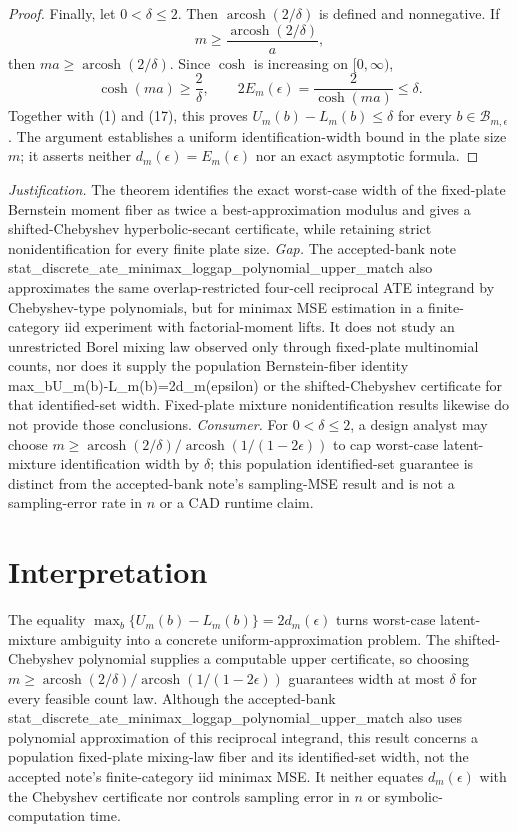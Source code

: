 \documentclass{article}
\begin{document}
\begin{proof}
Finally, let \(0<\delta\leq2\).  Then \(\operatorname{arcosh}(2/\delta)\) is defined and nonnegative.  If
\[
 m\geq\frac{\operatorname{arcosh}(2/\delta)}{a},
\]
then \(ma\geq\operatorname{arcosh}(2/\delta)\).  Since \(\cosh\) is increasing on \([0,\infty)\),
\[
 \cosh(ma)\geq\frac{2}{\delta},
 \qquad
 2E_m(\epsilon)=\frac{2}{\cosh(ma)}\leq\delta.
\]
Together with (1) and (17), this proves \(U_m(b)-L_m(b)\leq\delta\) for every \(b\in\mathcal B_{m,\epsilon}\).  The argument establishes a uniform identification-width bound in the plate size \(m\); it asserts neither \(d_m(\epsilon)=E_m(\epsilon)\) nor an exact asymptotic formula.
\end{proof}
\par\smallskip\noindent \textit{Justification.} The theorem identifies the exact worst-case width of the fixed-plate Bernstein moment fiber as twice a best-approximation modulus and gives a shifted-Chebyshev hyperbolic-secant certificate, while retaining strict nonidentification for every finite plate size. \textit{Gap.} The accepted-bank note stat\_discrete\_ate\_minimax\_loggap\_polynomial\_upper\_match also approximates the same overlap-restricted four-cell reciprocal ATE integrand by Chebyshev-type polynomials, but for minimax MSE estimation in a finite-category iid experiment with factorial-moment lifts. It does not study an unrestricted Borel mixing law observed only through fixed-plate multinomial counts, nor does it supply the population Bernstein-fiber identity max\_b{U\_m(b)-L\_m(b)}=2d\_m(epsilon) or the shifted-Chebyshev certificate for that identified-set width. Fixed-plate mixture nonidentification results likewise do not provide those conclusions. \textit{Consumer.} For \(0<\delta\leq2\), a design analyst may choose \(m\geq\operatorname{arcosh}(2/\delta)/\operatorname{arcosh}(1/(1-2\epsilon))\) to cap worst-case latent-mixture identification width by \(\delta\); this population identified-set guarantee is distinct from the accepted-bank note's sampling-MSE result and is not a sampling-error rate in \(n\) or a CAD runtime claim.

\section{Interpretation}

The equality \(\max_b\{U_m(b)-L_m(b)\}=2d_m(\epsilon)\) turns worst-case latent-mixture ambiguity into a concrete uniform-approximation problem. The shifted-Chebyshev polynomial supplies a computable upper certificate, so choosing \(m\geq\operatorname{arcosh}(2/\delta)/\operatorname{arcosh}(1/(1-2\epsilon))\) guarantees width at most \(\delta\) for every feasible count law. Although the accepted-bank stat\_discrete\_ate\_minimax\_loggap\_polynomial\_upper\_match also uses polynomial approximation of this reciprocal integrand, this result concerns a population fixed-plate mixing-law fiber and its identified-set width, not the accepted note's finite-category iid minimax MSE. It neither equates \(d_m(\epsilon)\) with the Chebyshev certificate nor controls sampling error in \(n\) or symbolic-computation time.
\end{document}
